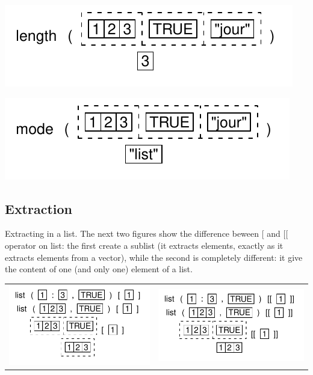 \documentclass[pdflatex]{article}
\begin{document}
\includegraphics{list_length}

\includegraphics{list_mode}

\subsection{Extraction}

Extracting in a list. The next two figures show the difference beween [ and [[ operator on list: the first create a sublist (it extracts elements, exactly as it extracts elements from a vector), while the second is completely different: it give the content of one (and only one) element of a list.

\begin{tabular}{cc}
\includegraphics{list_extract_simple.pdf} & \includegraphics{list_extract_double.pdf}
\end{tabular}
\end{document}
